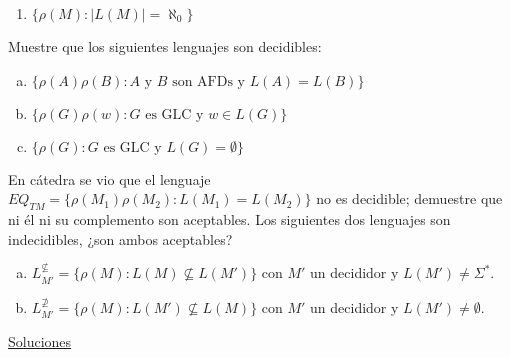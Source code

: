 \documentclass[dcc]{fcfmcourse}
\begin{document}
\begin{problems}
\begin{enumerate}[a)]
\begin{enumerate}[1.]
         \item $\{\rho (M) \colon |L(M)| = \aleph_{0}\}$
     \end{enumerate}
 \end{enumerate}
 \problem Muestre que los siguientes lenguajes son decidibles:
 \begin{enumerate}[a)]
     \item $\{\rho (A) \rho (B) \colon \text{$A$ y $B$ son AFDs y } L(A) = L(B)\}$
     \item $\{\rho(G)\rho(w)\colon \text{$G$ es GLC y } w\in L(G)\}$
     \item $\{\rho(G)\colon \text{$G$ es GLC y } L(G) = \emptyset \}$
 \end{enumerate}
 \problem En cátedra se vio que el lenguaje $EQ_{TM} =\{\rho(M_{1})\rho(M_{2}) \colon L(M_{1}) = L(M_{2})\}$ no es decidible; demuestre que ni él ni su complemento son aceptables.
 \problem Los siguientes dos lenguajes son indecidibles, ¿son ambos aceptables?
 \begin{enumerate}[a)]
     \item $L_{M'}^{\not\subseteq}=\{\rho(M) \colon L(M)\not\subseteq L(M')\}$ con $M'$ un decididor y $L(M') \not = \Sigma^*$.
  \item $L_{M'}^{\not\supseteq}=\{\rho(M) \colon L(M')\not\subseteq L(M)\}$ con $M'$ un decididor y $L(M') \not = \emptyset$.
 \end{enumerate}
\end{problems}
\newpage
\begin{center}
{\huge \underline{Soluciones}}
\end{center}
\end{document}
